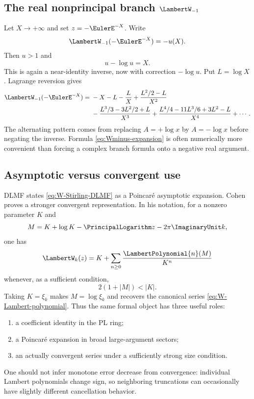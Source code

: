 \documentclass[11pt,oneside]{article}
\numberwithin{equation}{section}
\theoremstyle{definition}
\begin{document}
\subsection{The real nonprincipal branch \(\LambertW_{-1}\)}

Let \(X\to+\infty\) and set \(z=-\EulerE^{-X}\).  Write
\begin{equation}\label{eq:Wminus-u}
  \LambertW_{-1}(-\EulerE^{-X})=-u(X).
\end{equation}
Then \(u>1\) and
\begin{equation}\label{eq:u-minus-log-u}
  u-\log u=X.
\end{equation}
This is again a near-identity inverse, now with correction \(-\log u\).  Put
\(L=\log X\).  Lagrange reversion gives
\begin{align}
 \LambertW_{-1}(-\EulerE^{-X})={}&-X-L-\frac{L}{X}
 +\frac{L^2/2-L}{X^2}\nonumber\\
 &-\frac{L^3/3-3L^2/2+L}{X^3}
 +\frac{L^4/4-11L^3/6+3L^2-L}{X^4}
 +\cdots.
 \label{eq:Wminus-expansion}
\end{align}
The alternating pattern comes from replacing \(A=+\log x\) by
\(A=-\log x\) before negating the inverse.  Formula
\eqref{eq:Wminus-expansion} is often numerically more convenient than forcing a
complex branch formula onto a negative real argument.

\subsection{Asymptotic versus convergent use}

DLMF states \eqref{eq:W-Stirling-DLMF} as a Poincar\'e asymptotic expansion.
Cohen proves a stronger convergent representation.  In his notation, for a
nonzero parameter \(K\) and
\[
 M=K+\log K-\PrincipalLogarithm z-2\pi \ImaginaryUnit k,
\]
one has
\begin{equation}\label{eq:Cohen-K-expansion}
  \LambertW_k(z)=K+\sum_{n\ge0}\frac{\LambertPolynomial{n}(M)}{K^n}
\end{equation}
whenever, as a sufficient condition,
\begin{equation}\label{eq:Cohen-convergence-condition}
  2(1+|M|)<|K|.
\end{equation}
Taking \(K=\xi_k\) makes \(M=\log\xi_k\) and recovers the canonical series
\eqref{eq:W-Lambert-polynomial}.  Thus the same formal object has three useful
roles:
\begin{enumerate}
\item a coefficient identity in the PL ring;
\item a Poincar\'e expansion in broad large-argument sectors;
\item an actually convergent series under a sufficiently strong size condition.
\end{enumerate}
One should not infer monotone error decrease from convergence: individual
Lambert polynomials change sign, so neighboring truncations can occasionally
have slightly different cancellation behavior.
\end{document}
